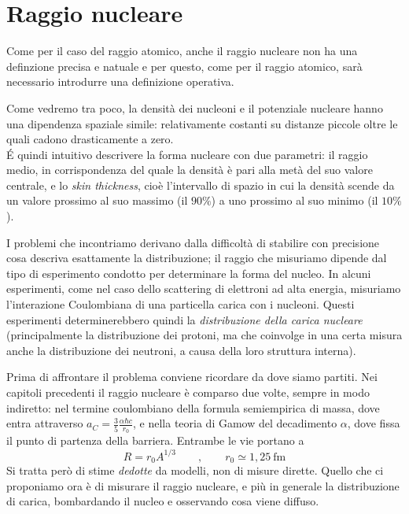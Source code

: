 \chapter{Raggio nucleare}

Come per il caso del raggio atomico, anche il raggio nucleare non ha una definzione precisa e natuale e per questo, come per il raggio atomico, sarà necessario introdurre una definizione operativa. 

Come vedremo tra poco, la densità dei nucleoni e il potenziale nucleare hanno una dipendenza spaziale simile: relativamente costanti su distanze piccole oltre le quali cadono drasticamente a zero. \\
\'E quindi intuitivo descrivere la forma nucleare con due parametri: il raggio medio, in corrispondenza del quale la densità è pari alla metà del suo valore centrale, e lo \emph{skin thickness}, cioè l'intervallo di spazio in cui la densità scende da un valore prossimo al suo massimo (il $90\%$) a uno prossimo al suo minimo (il $10\%$).

I problemi che incontriamo derivano dalla difficoltà di stabilire con precisione cosa descriva esattamente la distribuzione; il raggio che misuriamo dipende dal tipo di esperimento condotto per determinare la forma del nucleo. In alcuni esperimenti, come nel caso dello scattering di elettroni ad alta energia, misuriamo l'interazione Coulombiana di una particella carica con i nucleoni. Questi esperimenti determinerebbero quindi la \emph{distribuzione della carica nucleare} (principalmente la distribuzione dei protoni, ma che coinvolge in una certa misura anche la distribuzione dei neutroni, a causa della loro struttura interna).

Prima di affrontare il problema conviene ricordare da dove siamo partiti. Nei capitoli precedenti il raggio nucleare è comparso due volte, sempre in modo indiretto: nel termine coulombiano della formula semiempirica di massa, dove entra attraverso $a_C = \frac{3}{5}\frac{\alpha\hbar c}{r_0}$, e nella teoria di Gamow del decadimento $\alpha$, dove fissa il punto di partenza della barriera. Entrambe le vie portano a
\begin{equation}
    R = r_0 A^{1/3} \qquad , \qquad r_0 \simeq 1{,}25 \ \mathrm{fm}
    \label{eq:raggio_A13}
\end{equation}
Si tratta però di stime \emph{dedotte} da modelli, non di misure dirette. Quello che ci proponiamo ora è di misurare il raggio nucleare, e più in generale la distribuzione di carica, bombardando il nucleo e osservando cosa viene diffuso.

